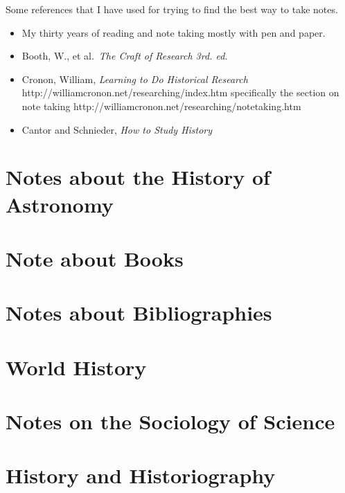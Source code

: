 \documentclass{article}
\begin{document}
Some references that I have used for trying to find the best way to take
notes.
\begin{itemize}
\item My thirty years of reading and note taking mostly with pen and  paper.
\item Booth, W., et al.\ {\it The Craft of Research 3rd. ed.}
  \cite{Booth2008}
\item Cronon, William, {\it Learning to Do Historical Research}
  http://williamcronon.net/researching/index.htm specifically the
  section on note taking
  http://williamcronon.net/researching/notetaking.htm
  \cite{Cronon2008}
\item Cantor and Schnieder, {\it How to Study History} \cite{Cantor1967}
\end{itemize}



\section{Notes about the History of Astronomy}


\section{Note about Books}


\section{Notes about Bibliographies}


\section{World History}


%

\section{Notes on the Sociology of Science}


\section{History and Historiography}


\vfil\eject

\printbibliography
\end{document}
